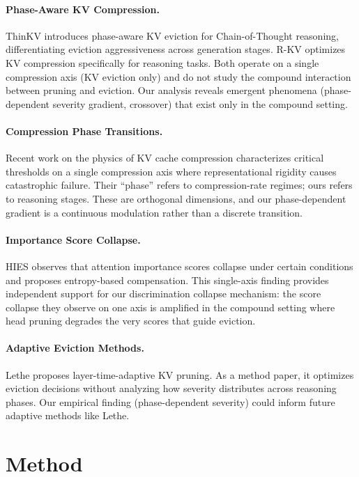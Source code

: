 \documentclass[11pt,a4paper]{article}
\begin{document}
\paragraph{Phase-Aware KV Compression.} ThinKV introduces phase-aware KV eviction for Chain-of-Thought reasoning, differentiating eviction aggressiveness across generation stages. R-KV optimizes KV compression specifically for reasoning tasks. Both operate on a single compression axis (KV eviction only) and do not study the compound interaction between pruning and eviction. Our analysis reveals emergent phenomena (phase-dependent severity gradient, crossover) that exist only in the compound setting.

\paragraph{Compression Phase Transitions.} Recent work on the physics of KV cache compression characterizes critical thresholds on a single compression axis where representational rigidity causes catastrophic failure. Their ``phase'' refers to compression-rate regimes; ours refers to reasoning stages. These are orthogonal dimensions, and our phase-dependent gradient is a continuous modulation rather than a discrete transition.

\paragraph{Importance Score Collapse.} HIES observes that attention importance scores collapse under certain conditions and proposes entropy-based compensation. This single-axis finding provides independent support for our discrimination collapse mechanism: the score collapse they observe on one axis is amplified in the compound setting where head pruning degrades the very scores that guide eviction.

\paragraph{Adaptive Eviction Methods.} Lethe proposes layer-time-adaptive KV pruning. As a method paper, it optimizes eviction decisions without analyzing how severity distributes across reasoning phases. Our empirical finding (phase-dependent severity) could inform future adaptive methods like Lethe.

\section{Method}
\end{document}

